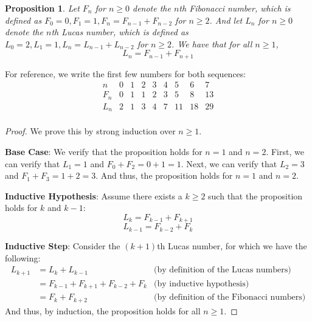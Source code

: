 \documentclass{article}
\theoremstyle{plain}
\newtheorem{proposition}{Proposition}
\theoremstyle{definition}
\begin{document}
\begin{proposition}
    Let \(F_n\) for \(n \geq 0\) denote the \(n\)th Fibonacci number, which is defined as \(F_0 = 0, F_1 = 1, F_n = F_{n-1} + F_{n-2}\) for \(n \geq 2\). And let \(L_n\) for \(n \geq 0\) denote the \(n\)th Lucas number, which is defined as \(L_0 = 2, L_1 = 1, L_n = L_{n-1} + L_{n-2}\) for \(n \geq 2\). We have that for all \(n \geq 1\),
    \[L_n = F_{n-1} + F_{n+1}\]
\end{proposition}

For reference, we write the first few numbers for both sequences:
\[\begin{array}{c|c|c|c|c|c|c|c|c}
    n   & 0 & 1 & 2 & 3 & 4 & 5 & 6 & 7 \\
    \hline \hline
    F_n & 0 & 1 & 1 & 2 & 3 & 5 & 8 & 13 \\
    \hline
    L_n & 2 & 1 & 3 & 4 & 7 & 11 & 18 & 29 \\
\end{array}\]

\begin{proof}
    We prove this by strong induction over \(n \geq 1\).
    
    \textbf{Base Case}: We verify that the proposition holds for \(n=1\) and \(n=2\). First, we can verify that \(L_1 = 1\) and \(F_0 + F_2 = 0 + 1 = 1\). Next, we can verify that \(L_2 = 3\) and \(F_1 + F_3 = 1 + 2 = 3\). And thus, the proposition holds for \(n=1\) and \(n=2\).

    \textbf{Inductive Hypothesis}: Assume there exists a \(k \geq 2\) such that the proposition holds for \(k\) and \(k-1\):
    \[L_k = F_{k-1} + F_{k+1}\]
    \[L_{k-1} = F_{k-2} + F_{k}\]

    \textbf{Inductive Step}: Consider the \((k+1)\)th Lucas number, for which we have the following:
    \[\begin{array}{rll}
        L_{k+1} \!\!\!\! &= L_{k} + L_{k-1} & \text{(by definition of the Lucas numbers)} \\
        &= F_{k-1} + F_{k+1} + F_{k-2} + F_{k} & \text{(by inductive hypothesis)} \\
        &= F_{k} + F_{k+2} & \text{(by definition of the Fibonacci numbers)}
    \end{array}\]
    And thus, by induction, the proposition holds for all \(n \geq 1\).
\end{proof}
\end{document}
